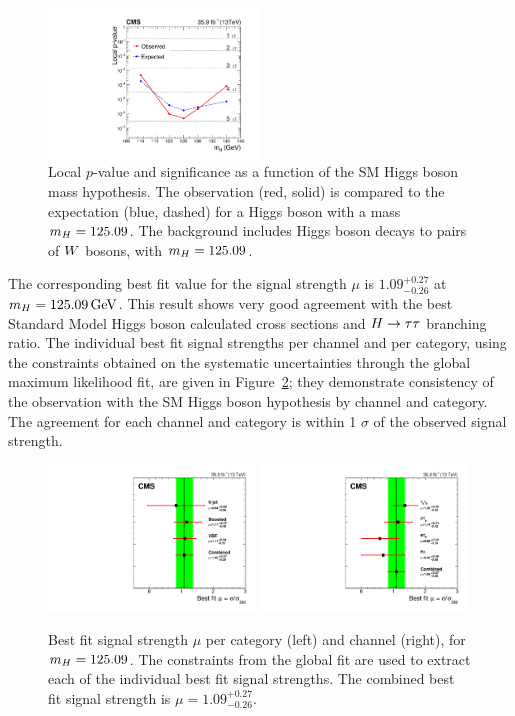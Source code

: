 \begin{figure}[!ht]
  \centering
    \includegraphics[width=0.5\textwidth]{higgs_to_taus/plots/Figure_020.pdf}
   \caption{Local ${p}$-value and significance as a function of the SM Higgs boson mass hypothesis. The 
observation (red, solid) is compared to the expectation (blue, dashed) for a Higgs boson with a mass 
$m_{H} = 125.09$\GeV. The background includes Higgs boson decays to pairs of $W$ bosons, with $m_{H} = 125.09$\GeV.}
\label{fig:htt_pvalue}
\end{figure}


The corresponding best fit value for the signal strength $\mu$ is $1.09 ^{+0.27} _{-0.26}$ at $m_{H} = 125.09\,\mathrm{GeV}$. 
This result shows very good agreement with the best Standard Model Higgs boson calculated cross sections
and $H\to\tau\tau$ branching ratio.
The individual best fit signal strengths per channel and per category, using the constraints obtained on the 
systematic uncertainties through the global maximum likelihood fit, are given in Figure~\ref{fig:htt_muvalue}; they demonstrate 
consistency of the observation with the SM Higgs boson hypothesis by channel and category. The agreement
for each channel and category is within 1 $\sigma$ of the observed signal strength.

\begin{figure}[!ht]
  \centering
    \includegraphics[width=0.49\textwidth]{higgs_to_taus/plots/Figure_021-a.pdf}
    \includegraphics[width=0.49\textwidth]{higgs_to_taus/plots/Figure_021-b.pdf}
   \caption{Best fit signal strength $\mu$ per category (left) and channel (right), for $m_{H} = 125.09$\GeV. 
The constraints from the global fit are used to extract each of the individual best fit signal strengths. 
The combined best fit signal strength is $\mu = 1.09 ^{+0.27} _{-0.26}$.}
\label{fig:htt_muvalue}
\end{figure}


